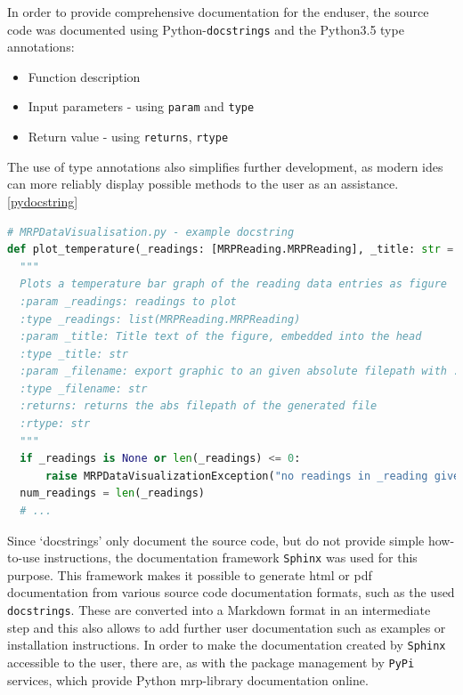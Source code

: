 In order to provide comprehensive documentation for the enduser, the
source code was documented using
Python-\passthrough{\lstinline!docstrings!}\cite{PythonDocstringReference}
and the Python3.5 type annotations:

\begin{itemize}
\tightlist
\item
  Function description
\item
  Input parameters - using \passthrough{\lstinline!param!} and
  \passthrough{\lstinline!type!}
\item
  Return value - using \passthrough{\lstinline!returns!},
  \passthrough{\lstinline!rtype!}
\end{itemize}

The use of type annotations also simplifies further development, as
modern \gls{ide}s can more reliably display possible methods to the user
as an assistance.\ref{pydocstring}

\begin{lstlisting}[language=Python, caption={Python docstring example}, label=lst:pydocstring]
# MRPDataVisualisation.py - example docstring
def plot_temperature(_readings: [MRPReading.MRPReading], _title: str = '', _filename: str = None, _unit: str = "degree C") -> str:
  """
  Plots a temperature bar graph of the reading data entries as figure
  :param _readings: readings to plot
  :type _readings: list(MRPReading.MRPReading)
  :param _title: Title text of the figure, embedded into the head
  :type _title: str
  :param _filename: export graphic to an given absolute filepath with .png
  :type _filename: str
  :returns: returns the abs filepath of the generated file
  :rtype: str
  """
  if _readings is None or len(_readings) <= 0:
      raise MRPDataVisualizationException("no readings in _reading given")
  num_readings = len(_readings)
  # ...
\end{lstlisting}

Since `docstrings' only document the source code, but do not provide
simple how-to-use instructions, the documentation framework
\passthrough{\lstinline!Sphinx!}\cite{SphinxDocumentation} was used
for this purpose. This framework makes it possible to generate
\gls{html} or \gls{pdf} documentation from various source code
documentation formats, such as the used
\passthrough{\lstinline!docstrings!}. These are converted into a
Markdown format in an intermediate step and this also allows to add
further user documentation such as examples or installation
instructions. In order to make the documentation created by
\passthrough{\lstinline!Sphinx!} accessible to the user, there are, as
with the package management by \passthrough{\lstinline!PyPi!} services,
which provide Python \gls{mrp}-library documentation online.

